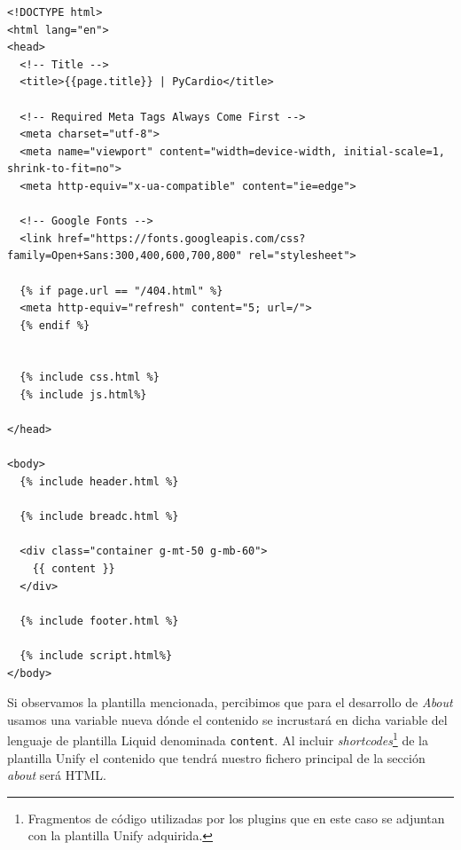 \begin{lstlisting}[style=htmlcssjs,caption=Layout Page,label={code:layoutPage}]
<!DOCTYPE html>
<html lang="en">
<head>
  <!-- Title -->
  <title>{{page.title}} | PyCardio</title>

  <!-- Required Meta Tags Always Come First -->
  <meta charset="utf-8">
  <meta name="viewport" content="width=device-width, initial-scale=1, shrink-to-fit=no">
  <meta http-equiv="x-ua-compatible" content="ie=edge">

  <!-- Google Fonts -->
  <link href="https://fonts.googleapis.com/css?family=Open+Sans:300,400,600,700,800" rel="stylesheet">

  {% if page.url == "/404.html" %}
  <meta http-equiv="refresh" content="5; url=/">
  {% endif %}


  {% include css.html %}
  {% include js.html%}

</head>

<body>
  {% include header.html %}
  
  {% include breadc.html %}

  <div class="container g-mt-50 g-mb-60">
    {{ content }}
  </div>

  {% include footer.html %}

  {% include script.html%}
</body>
\end{lstlisting}

Si observamos la plantilla mencionada, percibimos que para el desarrollo de \textit{About} usamos una variable nueva dónde el contenido se incrustará en  dicha variable del lenguaje de plantilla Liquid denominada \texttt{content}. Al incluir \textit{shortcodes}\footnote{Fragmentos de código utilizadas por los plugins que en este caso se adjuntan con la plantilla Unify adquirida.} de la plantilla Unify el contenido que tendrá nuestro fichero principal de la sección \textit{about} será HTML.

